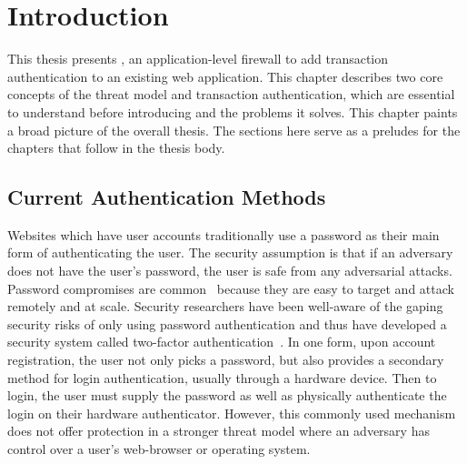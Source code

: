 \chapter{Introduction}

This thesis presents \sys{}, an application-level firewall to add transaction authentication to an existing web application. This chapter describes two core concepts of the threat model and transaction authentication, which are essential to understand before introducing \sys{} and the problems it solves. This chapter paints a broad picture of the overall thesis. The sections here serve as a preludes for the chapters that follow in the thesis body.





\section{Current Authentication Methods}

Websites which have user accounts traditionally use a password as their main form of authenticating the user. The security assumption is that if an adversary does not have the user's password, the user is safe from any adversarial attacks. Password compromises are common~\cite{questRemovePasswords} because they are easy to target and attack remotely and at scale. Security researchers have been well-aware of the gaping security risks of only using password authentication and thus have developed a security system called two-factor authentication~\cite{2FA}. In one form, upon account registration, the user not only picks a password, but also provides a secondary method for login authentication, usually through a hardware device. Then to login, the user must supply the password as well as physically authenticate the login on their hardware authenticator. However, this commonly used mechanism does not offer protection in a stronger threat model where an adversary has control over a user's web-browser or operating system. 

